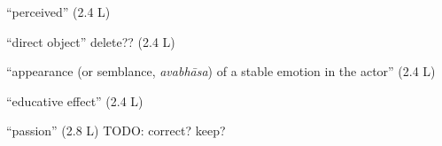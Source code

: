 \documentclass[10pt]{article}
\begin{document}
\begin{multicols}{2}
\begin{enumerate}[
			leftmargin=0em,
			rightmargin=0em,
		]
		 ``perceived'' (2.4 L)

		 ``direct object'' delete?? (2.4 L)

		 ``appearance (or semblance, \textit{avabhāsa}) of a stable emotion in the actor'' (2.4 L)

		 ``educative effect'' (2.4 L)

		 ``passion'' (2.8 L) TODO: correct? keep?




	\end{enumerate}
\end{multicols}

\end{document}

